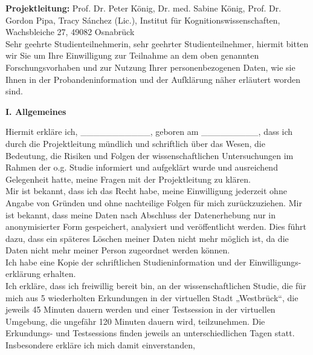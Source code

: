 \textbf{Projektleitung:} Prof. Dr. Peter König, Dr. med. Sabine König, Prof. Dr. Gordon Pipa, Tracy Sánchez (Lic.), Institut für Kognitionswissenschaften, Wachsbleiche 27, 49082 Osnabrück \\


Sehr geehrte Studienteilnehmerin, sehr geehrter Studienteilnehmer,
hiermit bitten wir Sie um Ihre Einwilligung zur Teilnahme an dem oben genannten Forschungsvorhaben und zur Nutzung Ihrer personenbezogenen Daten, wie sie Ihnen in der Probandeninformation und der Aufklärung näher erläutert worden sind. \\

\begin{center}
	\large{\textbf{I. Allgemeines}} \\
\end{center}

Hiermit erkläre ich, \_\_\_\_\_\_\_\_\_\_\_, geboren am \_\_\_\_\_\_\_\_\_, dass ich durch die Projektleitung mündlich und schriftlich über das Wesen, die Bedeutung, die Risiken und Folgen der wissenschaftlichen Untersuchungen im Rahmen der o.g. Studie informiert und aufgeklärt wurde und ausreichend Gelegenheit hatte, meine Fragen mit der Projektleitung zu klären. \\

Mir ist bekannt, dass ich das Recht habe, meine Einwilligung jederzeit ohne Angabe von Gründen und ohne nachteilige Folgen für mich zurückzuziehen. Mir ist bekannt, dass meine Daten nach Abschluss der Datenerhebung nur in anonymisierter Form gespeichert, analysiert und veröffentlicht werden. Dies führt dazu, dass ein späteres Löschen meiner Daten nicht mehr möglich ist, da die Daten nicht mehr meiner Person zugeordnet werden können. \\

Ich habe eine Kopie der schriftlichen Studieninformation und der Einwilligungs-erklärung erhalten. \\

Ich erkläre, dass ich freiwillig bereit bin, an der wissenschaftlichen Studie, die für mich aus 5 wiederholten Erkundungen in der virtuellen Stadt „Westbrück“, die jeweils 45 Minuten dauern werden und einer Testsession in der virtuellen Umgebung, die ungefähr 120 Minuten dauern wird, teilzunehmen. Die Erkundungs- und Testsessions finden jeweils an unterschiedlichen Tagen statt. \\

Insbesondere erkläre ich mich damit einverstanden, \\


